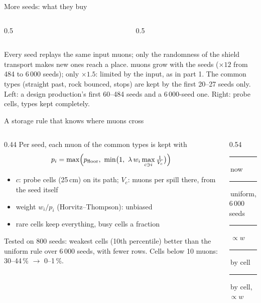 \documentclass[aspectratio=169,10pt]{beamer}
\newcommand{\legendline}[1]{{\color{muted}\lightfont\scriptsize #1}}
\newcommand{\sw}[1]{\textcolor[HTML]{#1}{\rule{1.1ex}{1.1ex}}}
\begin{document}
\begin{frame}{More seeds: what they buy}
  \begin{columns}[c]
    \begin{column}{0.5\textwidth}
    \end{column}
    \begin{column}{0.5\textwidth}
    \end{column}
  \end{columns}
  \vspace{1mm}\footnotesize
  Every seed replays the same input muons; only the randomness of the shield transport makes new ones reach a place.
   muons grow with the seeds ($\times12$ from 484 to 6\,000 seeds);  only $\times1.5$: limited by the input, as in part 1.
  The common types (straight past, rock bounced, stops) are kept by the first 20--27 seeds only.\\[0.5mm]
  \legendline{Left: a design production's first 60--484 seeds and a 6\,000-seed one. Right: probe cells, types kept completely.}
\end{frame}

\begin{frame}{A storage rule that knows where muons cross}
  \begin{columns}[c]
    \begin{column}{0.44\textwidth}\scriptsize
      Per seed, each muon of the common types is kept with
      \[ p_i = \max\Bigl(p_\text{floor},\ \min\bigl(1,\ \lambda\, w_i \max_{c \ni i} \tfrac{1}{V_c}\bigr)\Bigr) \]
      \vspace{-3mm}
      \begin{itemize}\scriptsize
        \item $c$: probe cells (25\,cm) on its path; $V_c$: muons per spill there, from the seed itself
        \item weight $w_i/p_i$ (Horvitz--Thompson): unbiased
        \item rare cells keep everything, busy cells a fraction
      \end{itemize}
      \vspace{1mm}
      Tested on 800 seeds: weakest cells (10th percentile)  better than the uniform rule over 6\,000 seeds, with fewer rows. Cells below 10 muons: 30--44\,\% $\to$ 0--1\,\%.\\[1mm]
    \end{column}
    \begin{column}{0.54\textwidth}
      \\[0.5mm]
      \legendline{\sw{2a78d6}\,now \sw{eb6834}\,uniform, 6\,000 seeds \sw{1baf7a}\,$\propto w$ \sw{eda100}\,by cell \sw{e87ba4}\,by cell, $\propto w$}\\[0.5mm]
    \end{column}
  \end{columns}
\end{frame}
\end{document}
